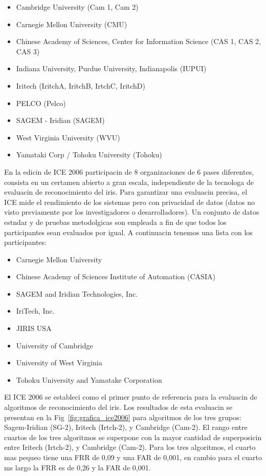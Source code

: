 \begin{itemize}
    \item Cambridge University (Cam 1, Cam 2)
    \item Carnegie Mellon University (CMU)
    \item Chinese Academy of Sciences, Center for Information Science (CAS 1, CAS 2, CAS 3)
    \item Indiana University, Purdue University, Indianapolis (IUPUI)
    \item Iritech (IritchA, IritchB, IrtchC, IritchD)
    \item PELCO (Pelco)
    \item SAGEM - Iridian (SAGEM)
    \item West Virginia University (WVU)
    \item Yamataki Corp / Tohoku University (Tohoku)
\end{itemize}

En la edicin de ICE 2006 participacin de 8 organizaciones de 6 pases diferentes, consista en un certamen abierto a gran escala, independiente de la tecnologa de evaluacin de reconocimiento del iris. Para garantizar una evaluacin precisa, el ICE mide el rendimiento de los sistemas pero con privacidad de datos (datos no visto previamente por los investigadores o desarrolladores). Un conjunto de datos estndar y de pruebas metodolgicas son empleada a fin de que todos los participantes sean evaluados por igual. A continuacin tenemos una lista con los participantes:

\begin{itemize}
    \item Carnegie Mellon University
    \item Chinese Academy of Sciences Institute of Automation (CASIA)
    \item SAGEM and Iridian Technologies, Inc.
    \item IriTech, Inc.
    \item JIRIS USA
    \item University of Cambridge
    \item University of West Virginia
    \item Tohoku University and Yamatake Corporation
\end{itemize}

El ICE 2006 se estableci como el primer punto de referencia para la evaluacin de algoritmos de reconocimiento del iris. Los resultados de esta evaluacin se presentan en la Fig~\ref{fig:grafica_ice2006} para algoritmos de los tres grupos: Sagem-Iridian (SG-2), Iritech (Irtch-2), y Cambridge (Cam-2). El rango entre cuartos de los tres algoritmos se superpone con la mayor cantidad de superposicin entre Iritech (Irtch-2), y Cambridge (Cam-2). Para los tres algoritmos, el cuarto mas pequeo tiene una FRR de 0,09 y una FAR de 0,001, en cambio para el cuarto ms largo la FRR es de 0,26 y la FAR de 0,001.

